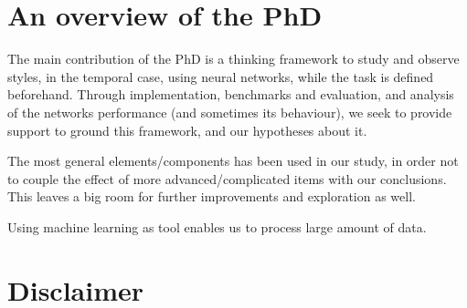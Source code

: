 \section{An overview of the PhD}
\par The main contribution of the PhD is a thinking framework to study and observe styles, in the temporal case, using neural networks, while the task is defined beforehand. Through implementation, benchmarks and evaluation, and analysis of the networks performance (and sometimes its behaviour), we seek to provide support to ground this framework, and our hypotheses about it.

\par The most general elements/components has been used in our study, in order not to couple the effect of more advanced/complicated items with our conclusions. This leaves a big room for further improvements and exploration as well.

\par Using machine learning as tool enables us to process large amount of data.

\section{Disclaimer}
\par
